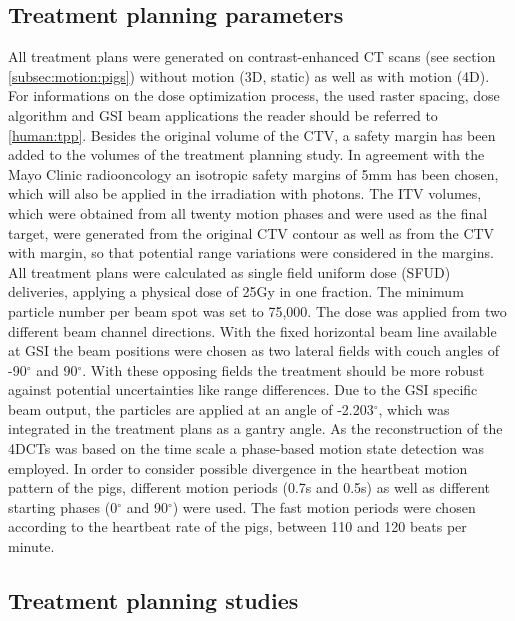 \subsection{Treatment planning parameters}

All treatment plans were generated on contrast-enhanced CT scans (see section \ref{subsec:motion:pigs}) without motion (3D, static) as well as 
with motion (4D).  For informations on the dose optimization process, the used raster spacing, dose 
algorithm and GSI beam applications the reader should be referred to \ref{human:tpp}.\newline
\newline
Besides the original volume of the CTV, a safety margin has been added to the volumes of the treatment planning study. In agreement with the 
Mayo Clinic radiooncology an isotropic safety margins of 5mm has been chosen, which will also be applied in the irradiation with photons. 
The ITV volumes\cite{Gra12}, which were obtained from all twenty motion phases and were used as the final target, were generated from the 
original CTV contour as well as from the CTV with margin, so that potential range variations were considered in the margins.
\newpage
All treatment plans were calculated as single field uniform dose (SFUD) deliveries, applying a physical dose of 25Gy in one fraction. The minimum particle number per beam spot was set to 75,000.
The dose was applied from two different beam channel directions. With the fixed horizontal beam line available at GSI the beam positions 
were chosen as two lateral fields with couch angles of -90$^{\circ}$ and 90$^{\circ}$. With these opposing fields the treatment should be 
more robust against potential uncertainties like range differences. Due to the GSI specific beam output, the particles are applied at an 
angle of -2.203$^{\circ}$, which was integrated in the treatment plans as a gantry angle.\newline
\newline
As the reconstruction of the 4DCTs was based on the time scale a phase-based motion state detection was employed. 
In order to consider possible divergence in the heartbeat motion pattern of the pigs, different motion periods (0.7s and 0.5s) as well as 
different starting phases (0$^{\circ}$ and 90$^{\circ}$) were used. The fast motion periods were chosen according to the  
heartbeat rate of the pigs, between 110 and 120 beats per minute.


\subsection{Treatment planning studies}

